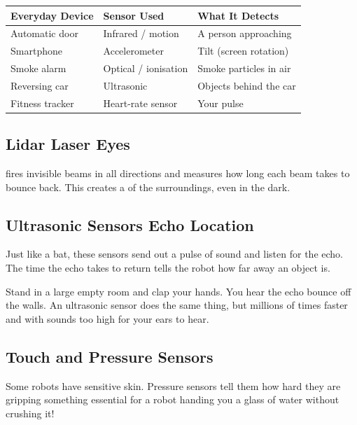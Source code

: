 \begin{center}
\begin{tabularx}{0.88\textwidth}{|X|X|X|}
  \hline
  \textbf{Everyday Device} & \textbf{Sensor Used} & \textbf{What It Detects} \\
  \hline
  Automatic door & Infrared / motion & A person approaching \\
  \hline
  Smartphone & Accelerometer & Tilt (screen rotation) \\
  \hline
  Smoke alarm & Optical / ionisation & Smoke particles in air \\
  \hline
  Reversing car & Ultrasonic & Objects behind the car \\
  \hline
  Fitness tracker & Heart-rate sensor & Your pulse \\
  \hline
\end{tabularx}
\end{center}

\sectionrule

\subsection*{Lidar \textemdash{} Laser Eyes}

 fires invisible  beams in all directions and measures
how long each beam takes to bounce back. This creates a  of the
surroundings, even in the dark.

\subsection*{Ultrasonic Sensors \textemdash{} Echo Location}

Just like a bat, these  sensors send out a pulse of sound and listen for the
echo. The time the echo takes to return tells the robot how far away an
object is.

\begin{picturethis}
  Stand in a large empty room and clap your hands. You hear the echo
  bounce off the walls. An ultrasonic sensor does the same thing, but
  millions of times faster and with sounds too high for your ears to hear.
\end{picturethis}

\subsection*{Touch and Pressure Sensors}

Some robots have sensitive skin. Pressure sensors tell them how hard
they are gripping something \textemdash{} essential for a robot handing you
a glass of water without crushing it!

